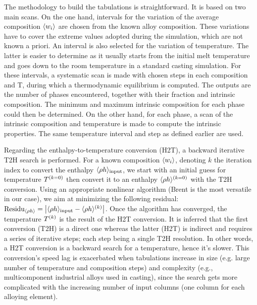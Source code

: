 The methodology to build the tabulations is straightforward. It is based on two main scans. On the one hand, intervals for the variation of the 
average composition $\langle w_i \rangle$ are chosen from the known alloy composition. These variations have to cover the extreme values adopted during the 
simulation, which are not known a priori. An interval is also selected for the variation of temperature. The latter is easier to determine as it
usually starts from the initial melt temperature and goes down to the room temperature in a standard casting simulation. For these intervals, a 
systematic scan is made with chosen steps in each composition and T, during which a thermodynamic equilibrium is computed. The outputs are the 
number of phases encountered, together with their fraction and intrinsic composition. The minimum and maximum intrinsic composition for each phase 
could then be determined. On the other hand, for each phase, a scan of the intrinsic composition and temperature is made to compute the intrinsic 
properties. The same temperature interval and step as defined earlier are used.

Regarding the enthalpy-to-temperature conversion (H2T), a backward iterative T2H search is performed. 
For a known composition $\langle w_i \rangle$, denoting $k$ the iteration index to convert the enthalpy 
$\langle \rho h \rangle_{\text{input}}$, we start with an initial guess for temperature $T^{\left( k=0 \right)}$ then convert it to an 
enthalpy  $\langle  \rho h  \rangle^{\left( k=0 \right)}$ with the T2H conversion. Using an appropriate nonlinear algorithm (Brent is the most versatile 
in our case), we aim at minimizing the following residual: $\text{Residu}_{\langle  \rho h  \rangle} = \left | \langle  \rho h  \rangle_{\text{input}} - \langle  \rho h  \rangle^{\left( k \right)}  \right |$. 
Once the algorithm has converged, the temperature $T^{\left( k \right)}$ is the result of the H2T conversion. It is 
inferred that the first conversion (T2H) is a direct one whereas the latter (H2T) is indirect and requires 
a series of iterative steps; each step being a single T2H resolution. In other words, a H2T conversion is a 
backward search for a temperature, hence it’s slower. This conversion’s speed lag is exacerbated when tabulations 
increase in size (e.g. large number of temperature and composition steps) and complexity (e.g., multicomponent 
industrial alloys used in casting), since the search gets more complicated with the increasing number of input 
columns (one column for each alloying element).


